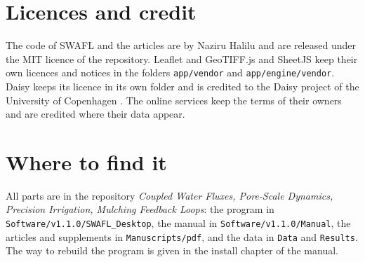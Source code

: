 \section{Licences and credit}
The code of SWAFL and the articles are by Naziru Halilu and are released under the MIT licence of the repository. Leaflet and GeoTIFF.js and SheetJS keep their own licences and notices in the folders \texttt{app/vendor} and \texttt{app/engine/vendor}. Daisy keeps its licence in its own folder and is credited to the Daisy project of the University of Copenhagen \citep{Hansen2012}. The online services keep the terms of their owners and are credited where their data appear.

\section{Where to find it}
All parts are in the repository \emph{Coupled Water Fluxes, Pore-Scale Dynamics, Precision Irrigation, Mulching Feedback Loops}: the program in \texttt{Software/v1.1.0/SWAFL\_Desktop}, the manual in \texttt{Software/v1.1.0/Manual}, the articles and supplements in \texttt{Manuscripts/pdf}, and the data in \texttt{Data} and \texttt{Results}. The way to rebuild the program is given in the install chapter of the manual.




